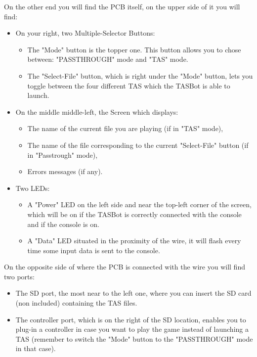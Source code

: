 \documentclass[a4paper,oneside,12pt]{article}
\begin{document}
On the other end you will find the PCB itself, on the upper side of it you will find:
\begin{itemize}
\item On your right, two Multiple-Selector Buttons:
		\begin{itemize}
		\item The "Mode" button is the topper one. This button allows you to chose between: "PASSTHROUGH" mode and "TAS" mode.
		\item The "Select-File" button, which is right under the "Mode" button, lets you toggle between the four different TAS which the TASBot is able to launch.
		\end{itemize}

\item On the middle middle-left, the Screen which displays:
		\begin{itemize}
		\item The name of the current file you are playing (if in "TAS" mode),
		\item The name of the file corresponding to the current "Select-File" button (if in "Passtrough" mode),
		\item Errors messages (if any).
		\end{itemize}

\item Two LEDs:
		\begin{itemize}
		\item A "Power" LED on the left side and near the top-left corner of the screen, which will be on if the TASBot is correctly connected with the console and if the console is on.
		\item A "Data" LED situated in the proximity of the wire, it will flash every time some input data is sent to the console.
		\end{itemize}
\end{itemize}

On the opposite side of where the PCB is connected with the wire you will find two ports:
\begin{itemize}
\item The SD port, the most near to the left one, where you can insert the SD card (non included) containing the TAS files.
\item The controller port, which is on the right of the SD location, enables you to plug-in a controller in case you want to play the game instead of launching a TAS (remember to switch the "Mode" button to the "PASSTHROUGH" mode in that case).
\end{itemize}
\end{document}

